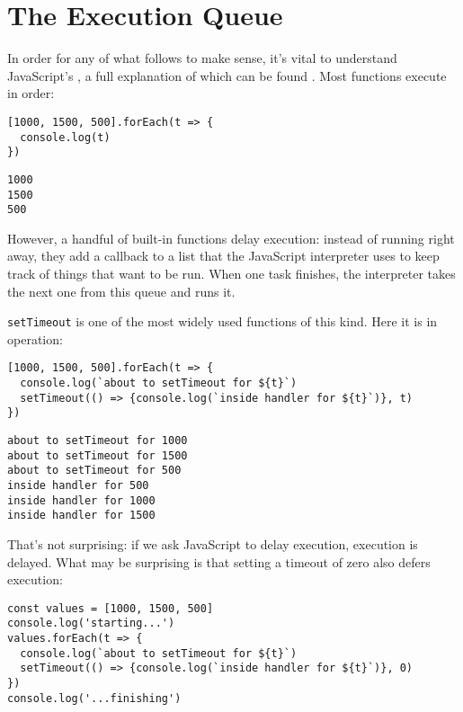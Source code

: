 \section{The Execution Queue}\label{s:promises-queue}

In order for any of what follows to make sense,
it's vital to understand JavaScript's ,
a full explanation of which can be found .
Most functions execute in order:

\begin{verbatim}
[1000, 1500, 500].forEach(t => {
  console.log(t)
})
\end{verbatim}

\begin{verbatim}
1000
1500
500
\end{verbatim}

However,
a handful of built-in functions delay execution:
instead of running right away,
they add a callback to a list that the JavaScript interpreter uses
to keep track of things that want to be run.
When one task finishes,
the interpreter takes the next one from this queue and runs it.

\texttt{setTimeout} is one of the most widely used functions of this kind.
Here it is in operation:

\begin{verbatim}
[1000, 1500, 500].forEach(t => {
  console.log(`about to setTimeout for ${t}`)
  setTimeout(() => {console.log(`inside handler for ${t}`)}, t)
})
\end{verbatim}

\begin{verbatim}
about to setTimeout for 1000
about to setTimeout for 1500
about to setTimeout for 500
inside handler for 500
inside handler for 1000
inside handler for 1500
\end{verbatim}

That's not surprising:
if we ask JavaScript to delay execution,
execution is delayed.
What may be surprising is that setting a timeout of zero also defers execution:

\begin{verbatim}
const values = [1000, 1500, 500]
console.log('starting...')
values.forEach(t => {
  console.log(`about to setTimeout for ${t}`)
  setTimeout(() => {console.log(`inside handler for ${t}`)}, 0)
})
console.log('...finishing')
\end{verbatim}

